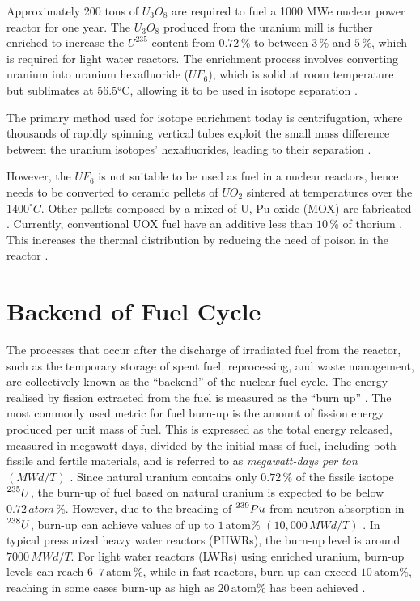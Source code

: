 Approximately 200 tons of \(U_3O_8\) are required to fuel a 1000 MWe nuclear power reactor for one year. The \(U_3O_8\) produced from the uranium mill is further enriched to increase the \(U^{235}\) content from \(0.72 \, \%\) to between \(3 \, \%\) and \(5 \, \%\), which is required for light water reactors. The enrichment process involves converting uranium into uranium hexafluoride (\(UF_6\)), which is solid at room temperature but sublimates at 56.5°C, allowing it to be used in isotope separation \cite{fuel_cycle_book}.

The primary method used for isotope enrichment today is centrifugation, where thousands of rapidly spinning vertical tubes exploit the small mass difference between the uranium isotopes' hexafluorides, leading to their separation \cite{fuel_cycle_book}.

However, the \(UF_6\) is not suitable to be used as fuel in a nuclear reactors, hence needs to be converted to ceramic pellets of \(UO_2\) sintered at temperatures over the \(1400^{\circ}C\). Other pallets composed by a mixed of U, Pu oxide (MOX) are fabricated \cite{fuel_cycle_book}. Currently, conventional UOX fuel have an additive less than \(10 \, \%\) of thorium . This increases the thermal distribution by reducing the need of poison in the reactor \cite{Th_cycle_viability}.

\section{Backend of Fuel Cycle}

The processes that occur after the discharge of irradiated fuel from the reactor, such as the temporary storage of spent fuel, reprocessing, and waste management, are collectively known as the ``backend'' of the nuclear fuel cycle. The energy realised by fission extracted from the fuel is measured as the ``burn up'' \cite{fuel_cycle_book}. The most commonly used metric for fuel burn-up is the amount of fission energy produced per unit mass of fuel. This is expressed as the total energy released, measured in megawatt-days, divided by the initial mass of fuel, including both fissile and fertile materials, and is referred to as \textit{megawatt-days per ton} \((MWd/T)\) \cite{nuclear_reactors_adv}. Since natural uranium contains only \(0.72 \, \%\) of the fissile isotope \(\prescript{235}{}{U}\), the burn-up of fuel based on natural uranium is expected to be below \(0.72 \, atom \, \%\). However, due to the breading of \(\prescript{239}{}{Pu}\) from neutron absorption in \(\prescript{238}{}{U}\), burn-up can achieve values of up to \(1 \, \text{atom} \%\) \((10,000 \, MWd/T)\) \cite{fuel_cycle_book}. In typical pressurized heavy water reactors (PHWRs), the burn-up level is around \(7000 \, MWd/T\). For light water reactors (LWRs) using enriched uranium, burn-up levels can reach \(6–7 \, \text{atom} \, \%\), while in fast reactors, burn-up can exceed \(10 \, \text{atom} \%\), reaching in some cases burn-up as high as \(20 \, \text{atom} \%\) has been achieved \cite{fuel_cycle_book}.

